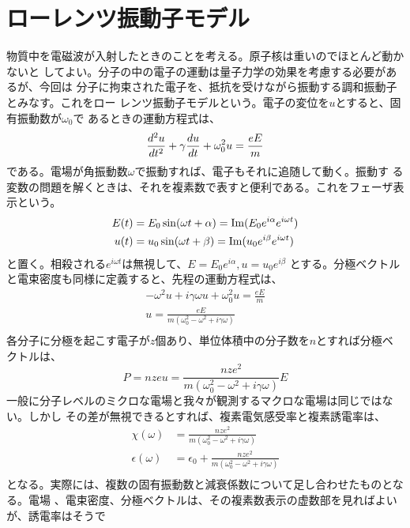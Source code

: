     \section{ローレンツ振動子モデル}
        物質中を電磁波が入射したときのことを考える。原子核は重いのでほとんど動かないと
        してよい。分子の中の電子の運動は量子力学の効果を考慮する必要があるが、今回は
        分子に拘束された電子を、抵抗を受けながら振動する調和振動子とみなす。これをロー
        レンツ振動子モデルという。電子の変位を$u$とすると、固有振動数が$\omega_0$で
        あるときの運動方程式は、
            \[\de[^2u]{t^2} + \gamma \de[u]{t} + \omega_0^2u = \frac{eE}{m}\]
        である。電場が角振動数$\omega$で振動すれば、電子もそれに追随して動く。振動す
        る変数の問題を解くときは、それを複素数で表すと便利である。これをフェーザ表示という。
        \begin{align*}
            E(t) &= E_0\sin(\omega t + \alpha) = {\rm Im} (E_0e^{i\alpha}e^{i\omega t})\\
            u(t) &= u_0\sin(\omega t + \beta) = {\rm Im} (u_0e^{i\beta}e^{i\omega t})\\
        \end{align*}
        と置く。相殺される$e^{i\omega t}$は無視して、$E = E_0e^{i\alpha},u = u_0e^{i\beta}$
        とする。分極ベクトルと電束密度も同様に定義すると、先程の運動方程式は、
        \begin{gather*}
            -\omega^2 u + i\gamma\omega u + \omega_0^2 u = \frac{eE}{m}\\
            u = \frac{eE}{m(\omega_0^2 - \omega^2 + i\gamma\omega)}\\
        \end{gather*}
        各分子に分極を起こす電子が$z$個あり、単位体積中の分子数を$n$とすれば分極ベ
        クトルは、
            \[P = nzeu = \frac{nze^2}{m(\omega_0^2 - \omega^2 + i\gamma\omega)}E\]
        一般に分子レベルのミクロな電場と我々が観測するマクロな電場は同じではない。しかし
        その差が無視できるとすれば、複素電気感受率と複素誘電率は、
        \begin{align*}
            \chi(\omega) &= \frac{nze^2}{m(\omega_0^2 - \omega^2 + i\gamma\omega)}\\
            \epsilon(\omega) &= \epsilon_0 + \frac{nze^2}{m(\omega_0^2 - \omega^2 + i\gamma\omega)}\\
        \end{align*}
        となる。実際には、複数の固有振動数と減衰係数について足し合わせたものとなる。電場
        、電束密度、分極ベクトルは、その複素数表示の虚数部を見ればよいが、誘電率はそうで
